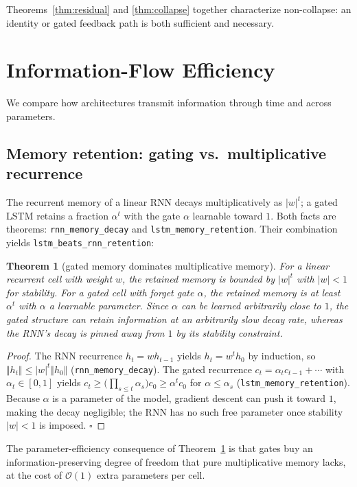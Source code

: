 \documentclass[journal]{IEEEtran}
\newtheorem{theorem}{Theorem}
\begin{document}
Theorems~\ref{thm:residual} and \ref{thm:collapse} together characterize
non-collapse: an identity or gated feedback path is both sufficient and
necessary.

\section{Information-Flow Efficiency}
\label{sec:info}
We compare how architectures transmit information through time and across
parameters.

\subsection{Memory retention: gating vs.\ multiplicative recurrence}
The recurrent memory of a linear RNN decays multiplicatively as $|w|^t$; a
gated LSTM retains a fraction $\alpha^t$ with the gate $\alpha$ learnable toward
$1$. Both facts are theorems: \texttt{rnn\_memory\_decay} and
\texttt{lstm\_memory\_retention}. Their combination yields
\texttt{lstm\_beats\_rnn\_retention}:

\begin{theorem}[gated memory dominates multiplicative memory]
\label{thm:gating}
For a linear recurrent cell with weight $w$, the retained memory is bounded by
$|w|^t$ with $|w|<1$ for stability. For a gated cell with forget gate $\alpha$,
the retained memory is at least $\alpha^t$ with $\alpha$ a learnable parameter.
Since $\alpha$ can be learned arbitrarily close to $1$, the gated structure can
retain information at an \emph{arbitrarily slow} decay rate, whereas the RNN's
decay is pinned away from $1$ by its stability constraint.
\end{theorem}

\begin{proof}
The RNN recurrence $h_t=wh_{t-1}$ yields $h_t=w^t h_0$ by induction, so
$\Vert h_t\Vert\le|w|^t\Vert h_0\Vert$ (\texttt{rnn\_memory\_decay}). The gated
recurrence $c_t=\alpha_t c_{t-1}+\cdots$ with $\alpha_t\in[0,1]$ yields
$c_t\ge \bigl(\prod_{s\le t}\alpha_s\bigr)c_0\ge \alpha^t c_0$ for
$\alpha\le\alpha_s$ (\texttt{lstm\_memory\_retention}). Because $\alpha$ is a
parameter of the model, gradient descent can push it toward $1$, making the
decay negligible; the RNN has no such free parameter once stability $|w|<1$ is
imposed. \hfill$\square$
\end{proof}

The parameter-efficiency consequence of Theorem~\ref{thm:gating} is that gates
buy an information-preserving degree of freedom that pure multiplicative memory
lacks, at the cost of $\mathcal{O}(1)$ extra parameters per cell.
\end{document}
